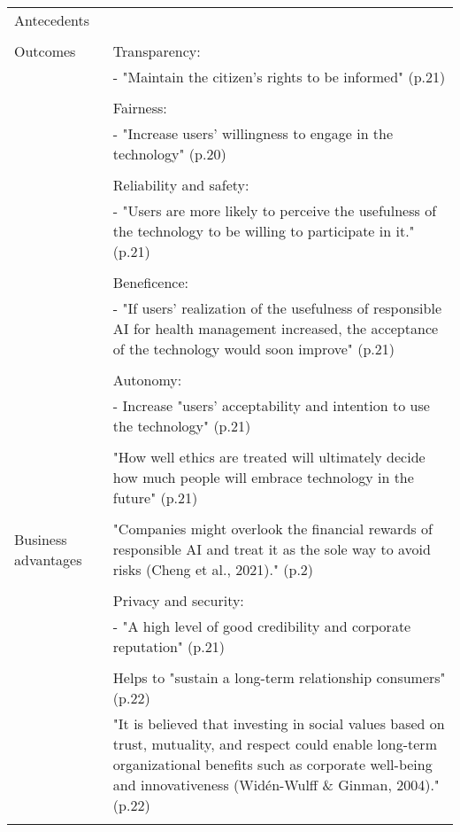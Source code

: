 \begin{ThreePartTable}
\begin{longtable}{P{0.2\textwidth}p{0.75\textwidth}}
        Antecedents & \tnote{*} \\\\

        Outcomes & Transparency: \\
        & - "Maintain the citizen’s rights to be informed" (p.21) \\\\
        & Fairness: \\
        & - "Increase users’ willingness to engage in the technology" (p.20) \\\\
        & Reliability and safety: \\
        & - "Users are more likely to perceive the usefulness of the technology to be willing to participate in it." (p.21) \\\\
        & Beneficence: \\
        & - "If users’ realization of the usefulness of responsible AI for health management increased, the acceptance of the technology would soon improve" (p.21) \\\\
        & Autonomy: \\
        & - Increase "users’ acceptability and intention to use the technology" (p.21) \\\\
        & "How well ethics are treated will ultimately decide how much people will embrace technology in the future" (p.21) \\\\

        Business advantages & "Companies might overlook the financial rewards of responsible AI and treat it as the sole way to avoid risks (Cheng et al., 2021)." (p.2) \\\\
        & Privacy and security: \\
        & - "A high level of good credibility and corporate reputation" (p.21) \\\\
        & Helps to "sustain a long-term relationship consumers" (p.22) \\
        & "It is believed that investing in social values based on trust, mutuality, and respect could enable long-term organizational benefits such as corporate well-being and innovativeness (Widén-Wulff \& Ginman, 2004)." (p.22) \\\\
        

\end{longtable}
\end{ThreePartTable}
